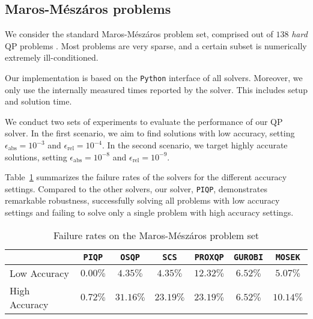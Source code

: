 \documentclass[letterpaper, 10 pt, conference]{ieeeconf}  \IEEEoverridecommandlockouts
\begin{document}
\subsection{Maros-Mészáros problems} 
\label{subsec:maros}

We consider the standard Maros-Mészáros problem set, comprised out of $138$ \textit{hard} QP problems \cite{maros1999}. Most problems are very sparse, and a certain subset is numerically extremely ill-conditioned.

Our implementation is based on the \texttt{Python} interface of all solvers. Moreover, we only use the internally measured times reported by the solver. This includes setup and solution time.


We conduct two sets of experiments to evaluate the performance of our QP solver. In the first scenario, we aim to find solutions with low accuracy, setting $\epsilon_{\mathrm{abs}} = 10^{-3}$ and $\epsilon_{\mathrm{rel}} = 10^{-4}$. In the second scenario, we target highly accurate solutions, setting $\epsilon_{\mathrm{abs}} = 10^{-8}$ and $\epsilon_{\mathrm{rel}} = 10^{-9}$.

Table~\ref{table:maros_meszaros_failure_rates} summarizes the failure rates of the solvers for the different accuracy settings. Compared to the other solvers, our solver, \texttt{PIQP}, demonstrates remarkable robustness, successfully solving all problems with low accuracy settings and failing to solve only a single problem with high accuracy settings.
\vspace{-0.5cm}
\begin{table}[htbp!]
\centering
\caption{Failure rates on the Maros-Mészáros problem set}
\renewcommand{\arraystretch}{1.5}
\tiny
\begin{tabular}{lcccccc} 
\hline
& \texttt{PIQP} &
\texttt{OSQP} & 
\texttt{SCS} & 
\texttt{PROXQP} & \texttt{GUROBI} & 
\texttt{MOSEK} \\\hline
Low Accuracy &  $0.00 \%$ & $4.35 \%$ & $4.35 \%$ & $12.32 \%$ & $6.52 \%$  & $5.07 \%$\\
\hline
High Accuracy &  $0.72 \%$  & $31.16 \%$& $23.19 \%$ & $23.19 \%$ & $6.52 \%$  & $10.14 \%$ \\
\hline
\end{tabular}
\label{table:maros_meszaros_failure_rates}
\end{table}
\end{document}
